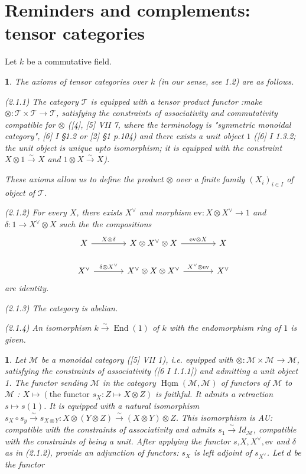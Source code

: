 \documentclass{article}
\newtheorem{env}[term]{}
\DeclareMathOperator{\Hom}{\text{Hom}}
\DeclareMathOperator{\End}{\text{End}}
\begin{document}
\section{Reminders and complements: tensor categories}
Let $k$ be a commutative field.
\begin{env}
  The axioms of tensor categories over $k$ (in our sense, see 1.2) are as follows.

  (2.1.1) \quad The category $\mathcal T$ is equipped with a tensor product functor 
  :make
  $\otimes: \mathcal T \times \mathcal T \rightarrow \mathcal T$, satisfying the constraints of associativity and 
  commutativity compatible for $\otimes$ ([4], [5] VII 7, where the terminology is "symmetric monoidal category",
  [6] I \S1.2 or [2] \S1 p.104) and there exists a unit object $1$ ([6] I 1.3.2; the unit object is unique upto 
  isomorphism; it is equipped with the constraint $X\otimes 1 \xrightarrow \sim X$ and 
  $1 \otimes X \xrightarrow\sim X$).

  These axioms allow us to define the product $\otimes$ over a finite family $(X_i)_{i \in I}$ of object of 
  $\mathcal T$.

  (2.1.2) \quad For every $X$, there exists $X ^\vee$ and morphism $\text{ev} : X \otimes X^\vee \rightarrow 1$ and
  $\delta: 1 \rightarrow X ^\vee \otimes X$ such the the compositions 
  $$\begin{tikzcd}[column sep=large]
    X \arrow[r,"X \otimes \delta"] & X\otimes X ^ \vee \otimes X \arrow[r,"\text{ev}\otimes X"] & X \\
    X^\vee \arrow[r,"\delta \otimes X^\vee"] & X^\vee\otimes X \otimes X^\vee \arrow[r,"X^\vee \otimes \text{ev}"] 
    & X^\vee
  \end{tikzcd}$$
  are identity.

  (2.1.3) \quad The category is abelian.

  (2.1.4) \quad An isomorphism $k \xrightarrow \sim \End(1)$ of $k$ with the endomorphism ring of $1$ is given.
\end{env}

\begin{env}
  Let $\mathcal M$ be a monoidal category ([5] VII 1), i.e. equipped with 
  $\otimes : \mathcal M \times \mathcal M \rightarrow \mathcal M$, satisfying the constraints of associativity 
  ([6 I 1.1.1]) and admitting a unit object 1. The functor sending $\mathcal M$ in the category
  $\underline{\Hom}(\mathcal M, \mathcal M)$ of functors of $\mathcal M$ to $\mathcal M$ :
  $X \mapsto (\text{the functor } s_X: Z \mapsto X \otimes Z)$ is faithful. It admits a retraction 
  $s \mapsto s(1)$. It is equipped with a natural isomorphism 
  $s_X \circ s_y \xrightarrow \sim s_{X\otimes Y}: X \otimes (Y \otimes Z) \xrightarrow \sim (X \otimes Y) \otimes Z$.
  This isomorphism is AU: compatible with the constraints of associativity and admits 
  $s_1 \xrightarrow \sim Id_{\mathcal M}$, compatible with the constraints of being a unit. After applying 
  the functor $s$,$X,X ^ \vee, \text{ev}$ and $\delta$ as in (2.1.2), provide an adjunction of functors:
  $s_X$ is left adjoint of $s_{X ^ \vee}$. Let $d$ be the functor
\end{env}
\end{document}
